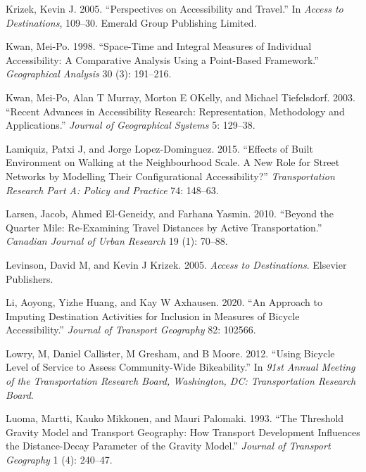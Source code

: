 \documentclass[preprint, 3p,
authoryear]{elsarticle} %
\newlength{\cslhangindent}
\newlength{\cslentryspacingunit} %
\newenvironment{CSLReferences}[2] %
 {%
  \setlength{\parindent}{0pt}
  \ifodd #1
  \let\oldpar\par
  \def\par{\hangindent=\cslhangindent\oldpar}
  \fi
  \setlength{\parskip}{#2\cslentryspacingunit}
 }%
 {}
\begin{document}
\begin{CSLReferences}{1}{0}
\leavevmode{}%
Krizek, Kevin J. 2005. {``Perspectives on Accessibility and Travel.''}
In \emph{Access to Destinations}, 109--30. Emerald Group Publishing
Limited.

\leavevmode{}%
Kwan, Mei-Po. 1998. {``Space-Time and Integral Measures of Individual
Accessibility: A Comparative Analysis Using a Point-Based Framework.''}
\emph{Geographical Analysis} 30 (3): 191--216.

\leavevmode{}%
Kwan, Mei-Po, Alan T Murray, Morton E OKelly, and Michael Tiefelsdorf.
2003. {``Recent Advances in Accessibility Research: Representation,
Methodology and Applications.''} \emph{Journal of Geographical Systems}
5: 129--38.

\leavevmode{}%
Lamiquiz, Patxi J, and Jorge Lopez-Dominguez. 2015. {``Effects of Built
Environment on Walking at the Neighbourhood Scale. A New Role for Street
Networks by Modelling Their Configurational Accessibility?''}
\emph{Transportation Research Part A: Policy and Practice} 74: 148--63.

\leavevmode{}%
Larsen, Jacob, Ahmed El-Geneidy, and Farhana Yasmin. 2010. {``Beyond the
Quarter Mile: Re-Examining Travel Distances by Active Transportation.''}
\emph{Canadian Journal of Urban Research} 19 (1): 70--88.

\leavevmode{}%
Levinson, David M, and Kevin J Krizek. 2005. \emph{Access to
Destinations}. Elsevier Publishers.

\leavevmode{}%
Li, Aoyong, Yizhe Huang, and Kay W Axhausen. 2020. {``An Approach to
Imputing Destination Activities for Inclusion in Measures of Bicycle
Accessibility.''} \emph{Journal of Transport Geography} 82: 102566.

\leavevmode{}%
Lowry, M, Daniel Callister, M Gresham, and B Moore. 2012. {``Using
Bicycle Level of Service to Assess Community-Wide Bikeability.''} In
\emph{91st Annual Meeting of the Transportation Research Board,
Washington, DC: Transportation Research Board}.

\leavevmode{}%
Luoma, Martti, Kauko Mikkonen, and Mauri Palomaki. 1993. {``The
Threshold Gravity Model and Transport Geography: How Transport
Development Influences the Distance-Decay Parameter of the Gravity
Model.''} \emph{Journal of Transport Geography} 1 (4): 240--47.


\end{CSLReferences}
\end{document}
